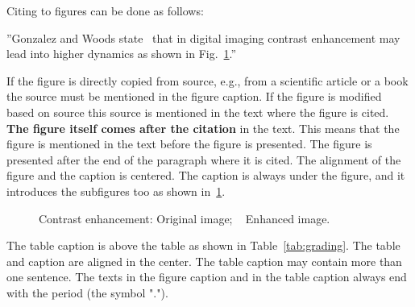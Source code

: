 \documentclass{lutmscthesis}[2017/10/03]
\begin{document}
Citing to figures can be done as follows:

”Gonzalez and Woods state~\cite{GonWoo:2002} 
that in digital imaging contrast enhancement may lead into higher dynamics 
as shown in Fig.~\ref{fig:contrast}.” 

If the figure is directly copied from source, e.g., from a scientific article or a book the source must be mentioned in the figure caption.  If the figure is modified based on source this source is mentioned in the text where the figure is cited. {\bf The figure itself comes after the citation} in the text. This means that the figure is mentioned in the text before the figure is presented. 
The figure is presented after the end of the paragraph where it is cited. The alignment of the figure and the caption is centered. 
The caption is always under the figure, and it introduces the subfigures too as shown in~\ref{fig:contrast}.

\begin{figure}[ht]
	\centering

 \caption[]{Contrast enhancement: 
Original image; 
~
Enhanced image.~\cite{GonWoo:2002}}
\label{fig:contrast}
\end{figure}

The table caption is above the table as shown in Table~\ref{tab:grading}. 
The table and caption are aligned in the center. 
The table caption may contain more than one sentence. 
The texts in the figure caption and in the table caption always end with the period (the symbol "."). 
\end{document}
